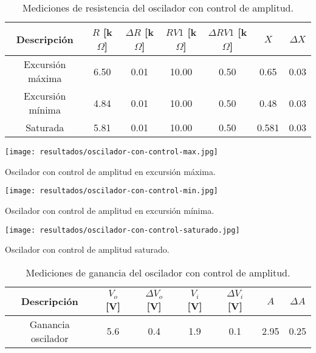 \begin{table}[ht]
\centering
\begin{tabular}{|c|c|c|c|c|c|c|}
\hline
Descripción & \(R\) [k\(\Omega\)] & \(\Delta R\) [k\(\Omega\)] & \(RV1\) [k\(\Omega\)] & \(\Delta RV1\) [k\(\Omega\)] & \(X\) & \(\Delta X\) \\ \hline
Excursión máxima & 6.50 & 0.01 & 10.00 & 0.50 & 0.65 & 0.03 \\ \hline
Excursión mínima & 4.84 & 0.01 & 10.00 & 0.50 & 0.48 & 0.03 \\ \hline
Saturada & 5.81 & 0.01 & 10.00 & 0.50 & 0.581 & 0.03 \\ \hline
\end{tabular}
\caption{Mediciones de resistencia del oscilador con control de amplitud.}
\label{tab:mediciones-resistencia-oscilador-con-control}
\end{table}

\begin{ilustracion}[ht]
    \centering
    \texttt{[image: resultados/oscilador-con-control-max.jpg]}
    \caption{Oscilador con control de amplitud en excursión máxima.}
    \label{fig:oscilador-con-control-excursion-maxima}
\end{ilustracion}

\begin{ilustracion}[ht]
    \centering
    \texttt{[image: resultados/oscilador-con-control-min.jpg]}
    \caption{Oscilador con control de amplitud en excursión mínima.}
    \label{fig:oscilador-con-control-excursion-minima}
\end{ilustracion}

\begin{ilustracion}[ht]
    \centering
    \texttt{[image: resultados/oscilador-con-control-saturado.jpg]}
    \caption{Oscilador con control de amplitud saturado.}
    \label{fig:oscilador-con-control-saturado}
\end{ilustracion}

\begin{table}[ht]
\centering
\begin{tabular}{|c|c|c|c|c|c|c|}
\hline
Descripción & \(V_o\) [V] & \(\Delta V_o\) [V] & \(V_i\) [V] & \(\Delta V_i\) [V] & \(A\) & \(\Delta A\) \\ \hline
Ganancia oscilador & 5.6 & 0.4 & 1.9 & 0.1 & 2.95 & 0.25 \\ \hline
\end{tabular}
\caption{Mediciones de ganancia del oscilador con control de amplitud.}
\label{tab:mediciones-ganancia-oscilador}
\end{table}

